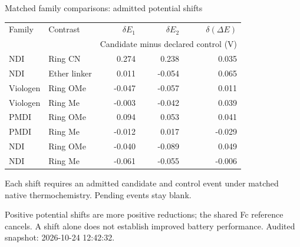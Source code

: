 \begin{frame}{Matched family comparisons: admitted potential shifts}
\scriptsize\centering\renewcommand{\arraystretch}{1.15}
\begin{tabular}{@{}llrrr@{}}\toprule
Family & Contrast & $\delta E_1$ & $\delta E_2$ & $\delta(\Delta E)$ \\
& & \multicolumn{3}{c}{Candidate minus declared control (V)} \\ \midrule
NDI & Ring CN & 0.274 & 0.238 & 0.035 \\
NDI & Ether linker & 0.011 & -0.054 & 0.065 \\
Viologen & Ring OMe & -0.047 & -0.057 & 0.011 \\
Viologen & Ring Me & -0.003 & -0.042 & 0.039 \\
PMDI & Ring OMe & 0.094 & 0.053 & 0.041 \\
PMDI & Ring Me & -0.012 & 0.017 & -0.029 \\
NDI & Ring OMe & -0.040 & -0.089 & 0.049 \\
NDI & Ring Me & -0.061 & -0.055 & -0.006 \\
\bottomrule\end{tabular}\par\vspace{1ex}\raggedright
\footnotesize Each shift requires an admitted candidate and control event under matched native thermochemistry. Pending events stay blank.
\par\vspace{1ex}Positive potential shifts are more positive reductions; the shared Fc reference cancels. A shift alone does not establish improved battery performance.
\vfill\scriptsize Audited snapshot: 2026-10-24 12:42:32.
\end{frame}
